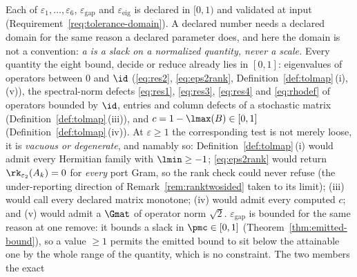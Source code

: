 
\begin{remark}
\label{rem:tolerancedomain}
Each of $\varepsilon_1,\dots,\varepsilon_6$, $\varepsilon_{\mathrm{gap}}$ and
$\varepsilon_{\mathrm{eig}}$ is declared in $[0,1)$ and validated at input
(Requirement~\ref{req:tolerance-domain}). A declared number needs a declared
domain for the same reason a declared parameter does, and here the domain is
not a convention: \emph{a  is a
slack on a normalized quantity, never a scale.} Every quantity the eight bound,
decide or reduce already lies in $[0,1]$: eigenvalues of operators between $0$
and $\id$ (\eqref{eq:res2}, \eqref{eq:eps2rank},
Definition~\ref{def:tolmap}\,(i),\,(v)), the spectral-norm defects
\eqref{eq:res1}, \eqref{eq:res3}, \eqref{eq:res4} and \eqref{eq:rhodef} of
operators bounded by $\id$, entries and column defects of a stochastic matrix
(Definition~\ref{def:tolmap}\,(iii)), and $c=1-\lmax(B)\in[0,1]$
(Definition~\ref{def:tolmap}\,(iv)). At $\varepsilon\ge1$ the corresponding
test is not merely loose, it is \emph{vacuous or degenerate}, and namably so:
Definition~\ref{def:tolmap}\,(i) would admit every Hermitian family with
$\lmin\ge-1$; \eqref{eq:eps2rank} would return $\rk_{\varepsilon_2}(A_k)=0$ for
\emph{every} port Gram, so the rank check could never refuse (the
under-reporting direction of Remark~\ref{rem:ranktwosided} taken to its
limit); (iii) would call every declared matrix monotone; (iv) would admit every
computed $c$; and (v) would admit a $\Gmat$ of operator norm $\sqrt2$.
$\varepsilon_{\mathrm{gap}}$ is bounded for the same reason at one remove: it
bounds a slack in $\pmc\in[0,1]$ (Theorem~\ref{thm:emitted-bound}), so a value
$\ge1$ permits the emitted bound to sit below the attainable one by the whole
range of the quantity, which is no constraint. The two members the exact

\end{remark}
